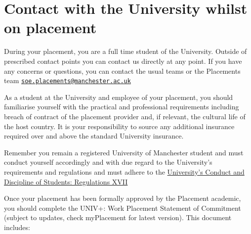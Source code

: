 \documentclass[
]{book}
\begin{document}
\section{Contact with the University whilst on placement}\label{contact-with-the-university-whilst-on-placement}

During your placement, you are a full time student of the University. Outside of prescribed contact points you can contact us directly at any point. If you have any concerns or questions, you can contact the usual teams or the Placements team \href{mailto:soe.placements@manchester.ac.uk}{\nolinkurl{soe.placements@manchester.ac.uk}}

As a student at the University and employee of your placement, you should familiarise yourself with the practical and professional requirements including breach of contract of the placement provider and, if relevant, the cultural life of the host country. It is your responsibility to source any additional insurance required over and above the standard University
insurance.

Remember you remain a registered University of Manchester student and must conduct yourself accordingly and with due regard to the University's requirements and regulations and must adhere to the
\href{https://documents.manchester.ac.uk/DocuInfo.aspx?DocID=6530}{University's Conduct and Discipline of Students: Regulations XVII} \citep{regulations}

Once your placement has been formally approved by the Placement academic, you should complete the UNIV+: Work Placement Statement of Commitment (subject to updates, check myPlacement for latest version). This document includes:
\end{document}
